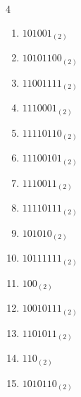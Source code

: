 \begin{multicols}{4}
\begin{enumerate}
        \phantom{$=125$}

  \item $101001_{(2)}$

        \phantom{$=41$}

\columnbreak %

  \item $10101100_{(2)}$

        \phantom{$=172$}

  \item $11001111_{(2)}$

        \phantom{$=207$}

  \item $1110001_{(2)}$

        \phantom{$=113$}

  \item $11110110_{(2)}$

        \phantom{$=246$}

  \item $11100101_{(2)}$

        \phantom{$=229$}

  \item $1110011_{(2)}$

        \phantom{$=115$}

  \item $11110111_{(2)}$

        \phantom{$=247$}

  \item $101010_{(2)}$

        \phantom{$=42$}

  \item $10111111_{(2)}$

        \phantom{$=191$}

  \item $100_{(2)}$

        \phantom{$=4$}

  \item $10010111_{(2)}$

        \phantom{$=151$}

  \item $1101011_{(2)}$

        \phantom{$=107$}

  \item $110_{(2)}$

        \phantom{$=6$}

  \item $1010110_{(2)}$


\end{enumerate}
\end{multicols}

